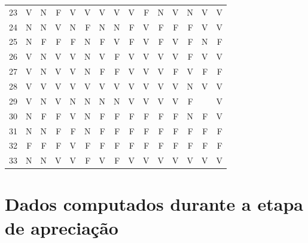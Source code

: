 \begin{apendicesenv}
\begin{center}
\begin{tabular}{ l r r r r r r r r r r r r r r}
	23	&	V	&	N	&	F	&	V	&	V	&	V	&	V	&	V	&	F	&	N	&	V	&	N	&	V	&	V	\\
	24	&	N	&	N	&	V	&	N	&	F	&	N	&	N	&	F	&	V	&	F	&	F	&	F	&	V	&	V	\\
	25	&	N	&	F	&	F	&	F	&	N	&	F	&	V	&	F	&	V	&	F	&	V	&	F	&	N	&	F	\\
	26	&	V	&	N	&	V	&	V	&	N	&	V	&	F	&	V	&	V	&	V	&	V	&	F	&	V	&	V	\\
	27	&	V	&	N	&	V	&	V	&	N	&	F	&	F	&	V	&	V	&	V	&	F	&	V	&	F	&	F	\\
	28	&	V	&	V	&	V	&	V	&	V	&	V	&	V	&	V	&	V	&	V	&	V	&	N	&	V	&	V	\\
	29	&	V	&	N	&	V	&	N	&	N	&	N	&	N	&	V	&	V	&	V	&	V	&	F	&		&	V	\\
	30	&	N	&	F	&	F	&	V	&	N	&	F	&	F	&	F	&	F	&	F	&	F	&	N	&	F	&	V	\\
	31	&	N	&	N	&	F	&	F	&	N	&	F	&	F	&	F	&	F	&	F	&	F	&	F	&	F	&	F	\\
	32	&	F	&	F	&	F	&	V	&	F	&	F	&	F	&	F	&	F	&	F	&	F	&	F	&	F	&	F	\\
	33	&	N	&	N	&	V	&	V	&	F	&	V	&	F	&	V	&	V	&	V	&	V	&	V	&	V	&	V	\\
	\hline
	\bottomrule
	\end{tabular}
\end{center}


\chapter{Dados computados durante a etapa de apreciação}\label{chap:resul3}


\end{apendicesenv}
